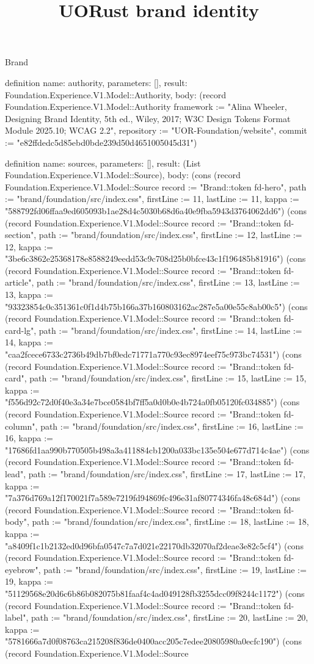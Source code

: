 \begin{lexlean}{Brand}
\title{UORust brand identity}
\begin{semanticmodule}
definition{
  name: authority,
  parameters: [],
  result: Foundation.Experience.V1.Model::Authority,
  body: (record Foundation.Experience.V1.Model::Authority {framework := "Alina Wheeler, Designing Brand Identity, 5th ed., Wiley, 2017; W3C Design Tokens Format Module 2025.10; WCAG 2.2", repository := "UOR-Foundation/website", commit := "e82ffdedc5d85ebd0bde239d50d4651005045d31"})
}

definition{
  name: sources,
  parameters: [],
  result: (List Foundation.Experience.V1.Model::Source),
  body: (cons (record Foundation.Experience.V1.Model::Source {record := "Brand::token fd-hero", path := "brand/foundation/src/index.css", firstLine := 11, lastLine := 11, kappa := "588792fd06ffaa9ed605093b1ae28d4c5030b68d6a40e9fba5943d3764062dd6"}) (cons (record Foundation.Experience.V1.Model::Source {record := "Brand::token fd-section", path := "brand/foundation/src/index.css", firstLine := 12, lastLine := 12, kappa := "3be6c3862e25368178e8588249eedd53c9c708d25b0bfce43c1f196485b81916"}) (cons (record Foundation.Experience.V1.Model::Source {record := "Brand::token fd-article", path := "brand/foundation/src/index.css", firstLine := 13, lastLine := 13, kappa := "93323854c0c351361c0f1d4b75b166a37b160803162ac287e5a00e55c8ab00c5"}) (cons (record Foundation.Experience.V1.Model::Source {record := "Brand::token fd-card-lg", path := "brand/foundation/src/index.css", firstLine := 14, lastLine := 14, kappa := "caa2fcece6733c2736b49db7bf0edc71771a770c93ec8974eef75c973bc74531"}) (cons (record Foundation.Experience.V1.Model::Source {record := "Brand::token fd-card", path := "brand/foundation/src/index.css", firstLine := 15, lastLine := 15, kappa := "f556d92c72d0f40e3a34e7bce0584bf7ff5a0d0b0e4b724a0fb05120fc034885"}) (cons (record Foundation.Experience.V1.Model::Source {record := "Brand::token fd-column", path := "brand/foundation/src/index.css", firstLine := 16, lastLine := 16, kappa := "17686fd1aa990b770505b498a3a411884cb1200a033bc135e504e677d714c4ae"}) (cons (record Foundation.Experience.V1.Model::Source {record := "Brand::token fd-lead", path := "brand/foundation/src/index.css", firstLine := 17, lastLine := 17, kappa := "7a376d769a12f170021f7a589e7219fd94869fc496e31af80774346fa48c684d"}) (cons (record Foundation.Experience.V1.Model::Source {record := "Brand::token fd-body", path := "brand/foundation/src/index.css", firstLine := 18, lastLine := 18, kappa := "a8409f1c1b2132ed0d96bfa0547c7a7d021e22170db32070af2deae3e82c5cf4"}) (cons (record Foundation.Experience.V1.Model::Source {record := "Brand::token fd-eyebrow", path := "brand/foundation/src/index.css", firstLine := 19, lastLine := 19, kappa := "51129568e20d6c6b86b082075b81faaf4c4ad049128fb3255dcc09f8244c1172"}) (cons (record Foundation.Experience.V1.Model::Source {record := "Brand::token fd-label", path := "brand/foundation/src/index.css", firstLine := 20, lastLine := 20, kappa := "5781666a7d0f08763ca215208f836de0400acc205c7edee20805980a0ecfc190"}) (cons (record Foundation.Experience.V1.Model::Source }
\end{semanticmodule}
\end{lexlean}
